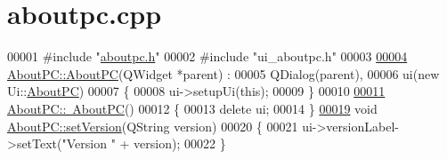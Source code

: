 \hypertarget{aboutpc_8cpp_source}{\section{aboutpc.\-cpp}
}

\begin{DoxyCode}
00001 \textcolor{preprocessor}{#include "\hyperlink{aboutpc_8h}{aboutpc.h}"}
00002 \textcolor{preprocessor}{#include "ui\_aboutpc.h"}
00003 
\hypertarget{aboutpc_8cpp_source_l00004}{}\hyperlink{class_about_p_c_a89341c4427d97da60acf15dc929ad8a6}{00004} \hyperlink{class_about_p_c_a89341c4427d97da60acf15dc929ad8a6}{AboutPC::AboutPC}(QWidget *parent) :
00005     QDialog(parent),
00006     ui(new Ui::\hyperlink{class_about_p_c}{AboutPC})
00007 \{
00008     ui->setupUi(\textcolor{keyword}{this});
00009 \}
00010 
\hypertarget{aboutpc_8cpp_source_l00011}{}\hyperlink{class_about_p_c_a3cc0c4c81abc640d946003b078a47dd4}{00011} \hyperlink{class_about_p_c_a3cc0c4c81abc640d946003b078a47dd4}{AboutPC::~AboutPC}()
00012 \{
00013     \textcolor{keyword}{delete} ui;
00014 \}
\hypertarget{aboutpc_8cpp_source_l00019}{}\hyperlink{class_about_p_c_aa3815d4826d0c8d87122449537a0a4d5}{00019} \textcolor{keywordtype}{void} \hyperlink{class_about_p_c_aa3815d4826d0c8d87122449537a0a4d5}{AboutPC::setVersion}(QString version)
00020 \{
00021     ui->versionLabel->setText(\textcolor{stringliteral}{"Version "} + version);
00022 \}
\end{DoxyCode}
